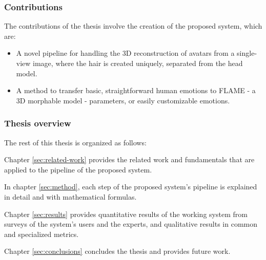 \subsubsection{Contributions}

The contributions of the thesis involve the creation of the proposed system, which are:

\begin{itemize}
  \item A novel pipeline for handling the 3D reconstruction of avatars from a single-view image, where the hair is created uniquely, separated from the head model.
  \item A method to transfer basic, straightforward human emotions to FLAME - a 3D morphable model - parameters, or easily customizable emotions.
\end{itemize}

\subsubsection{Thesis overview}

The rest of this thesis is organized as follows:

Chapter \ref{sec:related-work} provides the related work and fundamentals that are applied to the pipeline of the proposed system.

In chapter \ref{sec:method}, each step of the proposed system's pipeline is explained in detail and with mathematical formulas.

Chapter \ref{sec:results} provides quantitative results of the working system from surveys of the system's users and the experts, and qualitative results in common and specialized metrics.

Chapter \ref{sec:conclusions} concludes the thesis and provides future work.